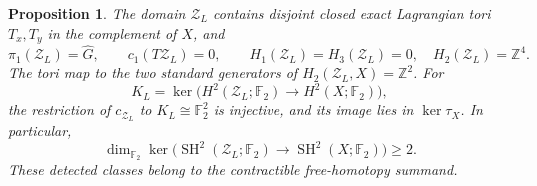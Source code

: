 \documentclass[11pt]{amsart}
\newtheorem{proposition}[theorem]{Proposition}
\theoremstyle{definition}
\theoremstyle{remark}
\newcommand{\Z}{\mathbb Z}
\newcommand{\Ftwo}{\mathbb F_2}
\begin{document}
\begin{proposition}\label{prop:exact-torus-transfer}
The domain $\mathcal Z_L$ contains disjoint closed exact
Lagrangian tori $T_x,T_y$ in the complement of $X$, and
\[
 \pi_1(\mathcal Z_L)=\widehat G,\qquad
 c_1(T\mathcal Z_L)=0,\qquad
 H_1(\mathcal Z_L)=H_3(\mathcal Z_L)=0,\quad
 H_2(\mathcal Z_L)=\Z^4.
\]
The tori map to the two standard generators of
$H_2(\mathcal Z_L,X)=\Z^2$. For
\[
 K_L=\ker\bigl(H^2(\mathcal Z_L;\Ftwo)
                         \longrightarrow H^2(X;\Ftwo)\bigr),
\]
the restriction of $c_{\mathcal Z_L}$ to $K_L\cong\Ftwo^2$
is injective, and its image lies in $\ker\tau_X$. In particular,
\begin{equation}\label{eq:exact-transfer-kernel}
 \dim_{\Ftwo}\ker\bigl(\operatorname{SH}^2(\mathcal Z_L;\Ftwo)
               \longrightarrow\operatorname{SH}^2(X;\Ftwo)\bigr)
                         \ge2.
\end{equation}
These detected classes belong to the contractible free-homotopy
summand.
\end{proposition}
\end{document}
